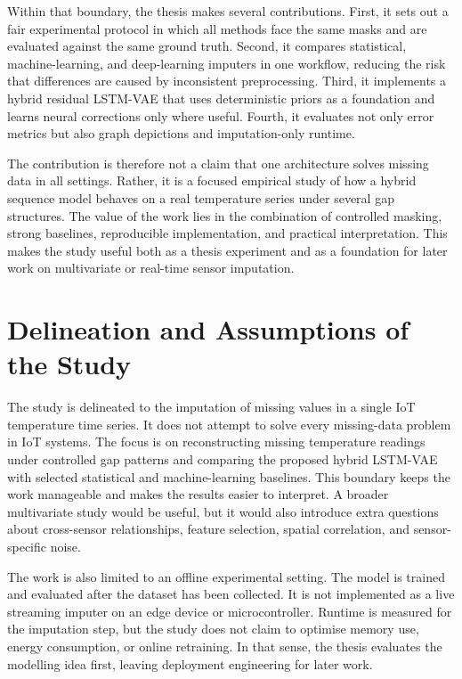 Within that boundary, the thesis makes several contributions. First, it sets out a fair experimental protocol in which all methods face the same masks and are evaluated against the same ground truth. Second, it compares statistical, machine-learning, and deep-learning imputers in one workflow, reducing the risk that differences are caused by inconsistent preprocessing. Third, it implements a hybrid residual LSTM-VAE that uses deterministic priors as a foundation and learns neural corrections only where useful. Fourth, it evaluates not only error metrics but also graph depictions and imputation-only runtime.

The contribution is therefore not a claim that one architecture solves missing data in all settings. Rather, it is a focused empirical study of how a hybrid sequence model behaves on a real temperature series under several gap structures. The value of the work lies in the combination of controlled masking, strong baselines, reproducible implementation, and practical interpretation. This makes the study useful both as a thesis experiment and as a foundation for later work on multivariate or real-time sensor imputation.

\section{Delineation and Assumptions of the Study}
The study is delineated to the imputation of missing values in a single IoT temperature time series. It does not attempt to solve every missing-data problem in IoT systems. The focus is on reconstructing missing temperature readings under controlled gap patterns and comparing the proposed hybrid LSTM-VAE with selected statistical and machine-learning baselines. This boundary keeps the work manageable and makes the results easier to interpret. A broader multivariate study would be useful, but it would also introduce extra questions about cross-sensor relationships, feature selection, spatial correlation, and sensor-specific noise.

The work is also limited to an offline experimental setting. The model is trained and evaluated after the dataset has been collected. It is not implemented as a live streaming imputer on an edge device or microcontroller. Runtime is measured for the imputation step, but the study does not claim to optimise memory use, energy consumption, or online retraining. In that sense, the thesis evaluates the modelling idea first, leaving deployment engineering for later work.

